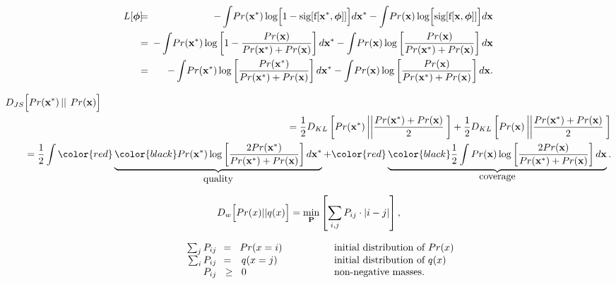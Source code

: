 \documentclass[letterpaper,twoside,openany, titlepage,oldfontcommands,titles,dvipsnames]{memoir}
\begin{document}
\begin{eqnarray}\label{eq:gan_integral_opt}
  L[\boldsymbol\phi]\!\!&\!=\!&\!\!-\int \!Pr(\mathbf{x}^{*})\log\Bigl[1-\mbox{sig}[\mbox{f}[\mathbf{x}^* ,\boldsymbol\phi]]\Bigr]d\mathbf{x}^* - \int \!Pr(\mathbf{x})\log\Bigl[\mbox{sig}[\mbox{f}[\mathbf{x},\boldsymbol\phi]]\Bigr]d\mathbf{x}\\
  \!\!&\!=\!&\!\!-\int \!Pr(\mathbf{x}^{*})\log\left[1-\frac{Pr(\mathbf{x})}{Pr(\mathbf{x}^{*})+Pr(\mathbf{x})}\right]d\mathbf{x}^* - \int\! Pr(\mathbf{x})\log\left[\frac{Pr(\mathbf{x})}{Pr(\mathbf{x}^{*})+Pr(\mathbf{x})}\right]d\mathbf{x}\nonumber \\
 \!\!&\!=\!&\!\!-\int \!Pr(\mathbf{x}^{*})\log\left[\frac{Pr(\mathbf{x}^{*})}{Pr(\mathbf{x}^{*})+Pr(\mathbf{x})}\right]d\mathbf{x}^* - \int \!Pr(\mathbf{x})\log\left[\frac{Pr(\mathbf{x})}{Pr(\mathbf{x}^{*})+Pr(\mathbf{x})}\right]d\mathbf{x}.\nonumber
 \end{eqnarray}

\begin{eqnarray}\label{eq:gan_js_dist}
 D_{JS}\Bigl[Pr(\mathbf{x}^{*})\left|\left|\right.\right.Pr(\mathbf{x})\Bigr] &&\\ &&\hspace{-3cm}=\frac{1}{2}D_{KL}\left[Pr(\mathbf{x}^{*})\left|\left|\frac{Pr(\mathbf{x}^{*})+Pr(\mathbf{x})}{2}\right.\right.\right]+\frac{1}{2}D_{KL}\left[Pr(\mathbf{x})\left|\left|\frac{Pr(\mathbf{x}^{*})+Pr(\mathbf{x})}{2}\right.\right.\right]\nonumber \\
 &&\hspace{-3cm}=\frac{1}{2}\int 
 \begingroup\color{red}
 \underbrace{\color{black} Pr(\mathbf{x}^{*})\log\left[\frac{2Pr(\mathbf{x}^{*})}{Pr(\mathbf{x}^{*})+Pr(\mathbf{x})}\right]d\mathbf{x}^*}_{\mbox{quality}} \endgroup
 +\begingroup\color{red}
 \underbrace{\color{black}\frac{1}{2}\int Pr(\mathbf{x})\log\left[\frac{2Pr(\mathbf{x})}{Pr(\mathbf{x}^{*})+Pr(\mathbf{x})}\right]d\mathbf{x}}_{\mbox{coverage}}\endgroup .\nonumber
 \end{eqnarray}

\begin{eqnarray}\label{eq:gan_was_primal_discrete}
 D_{w}\Bigl[Pr(x)||q(x)\Bigr] = \min_{\mathbf{P}} \left[\sum_{i,j} P_{ij}\cdot|i-j|\right],
 \end{eqnarray}

\begin{eqnarray}\label{eq:gan_primal_constraints}
 \begin{tabular}{rrrclcl}
 &&$\sum_{j}P_{ij}\!\!$ &$\!\!=\!\!$&~$\!\!\!Pr(x=i)$ &&\mbox{initial distribution of~$Pr(x)$}\\
 &&$\sum_{i}P_{ij}\!\!$ &$\!\!=\!\!$&~$\!\!q(x=j)$ &&\mbox{initial distribution of~$q(x)$}\\
 &&$P_{ij}\!\!$ &\!\!~$\geq\!\!$ &~$\!\!0$ &\hspace{1cm} &\mbox{non-negative masses}.
 \end{tabular}
 \end{eqnarray}
\end{document}
